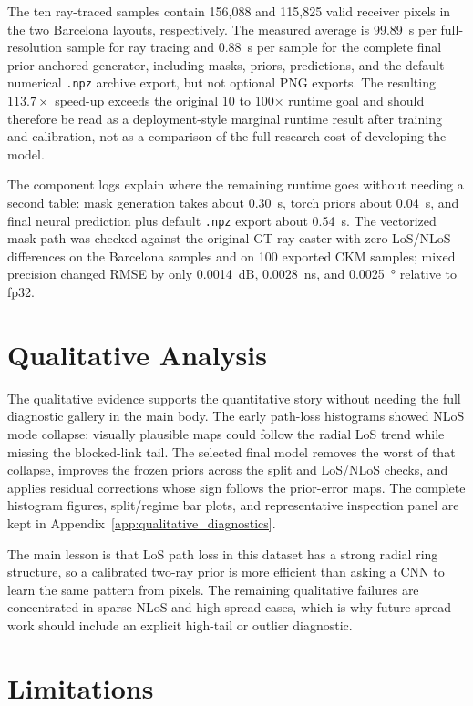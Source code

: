 The ten ray-traced samples contain 156{,}088 and 115{,}825 valid receiver
pixels in the two Barcelona layouts, respectively. The measured average is
\SI{99.89}{s} per full-resolution sample for ray tracing and \SI{0.88}{s} per
sample for the complete final prior-anchored generator, including masks,
priors, predictions, and the default numerical \texttt{.npz} archive export,
but not optional PNG exports. The
resulting \(113.7\times\) speed-up exceeds the original 10 to 100\(\times\)
runtime goal and should therefore be read as a
deployment-style marginal runtime result after training and calibration, not as
a comparison of the full research cost of developing the model.

The component logs explain where the remaining runtime goes without needing a
second table: mask generation takes about \SI{0.30}{s}, torch priors about
\SI{0.04}{s}, and final neural prediction plus default \texttt{.npz} export
about \SI{0.54}{s}. The vectorized mask path was checked against the original
GT ray-caster with zero LoS/NLoS differences on the Barcelona samples and on
100 exported CKM samples; mixed precision changed RMSE by only
\SI{0.0014}{dB}, \SI{0.0028}{ns}, and \SI{0.0025}{\degree} relative to fp32.

\section{Qualitative Analysis}
\label{sec:qualitative_analysis}

The qualitative evidence supports the quantitative story without needing the full diagnostic gallery in the main body. The early path-loss histograms showed NLoS mode collapse: visually plausible maps could follow the radial LoS trend while missing the blocked-link tail. The selected final model removes the worst of that collapse, improves the frozen priors across the split and LoS/NLoS checks, and applies residual corrections whose sign follows the prior-error maps. The complete histogram figures, split/regime bar plots, and representative inspection panel are kept in Appendix~\ref{app:qualitative_diagnostics}.

The main lesson is that LoS path loss in this dataset has a strong radial ring structure, so a calibrated two-ray prior is more efficient than asking a CNN to learn the same pattern from pixels. The remaining qualitative failures are concentrated in sparse NLoS and high-spread cases, which is why future spread work should include an explicit high-tail or outlier diagnostic.
\section{Limitations}

